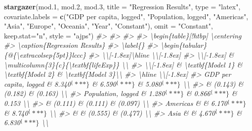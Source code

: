 \documentclass[
]{book}
\newenvironment{Shaded}{\begin{snugshade}}{\end{snugshade}}
\newcommand{\CommentTok}[1]{\textcolor[rgb]{0.56,0.35,0.01}{\textit{#1}}}
\newcommand{\DataTypeTok}[1]{\textcolor[rgb]{0.13,0.29,0.53}{#1}}
\newcommand{\FloatTok}[1]{\textcolor[rgb]{0.00,0.00,0.81}{#1}}
\newcommand{\KeywordTok}[1]{\textcolor[rgb]{0.13,0.29,0.53}{\textbf{#1}}}
\newcommand{\NormalTok}[1]{#1}
\newcommand{\StringTok}[1]{\textcolor[rgb]{0.31,0.60,0.02}{#1}}
\begin{document}
\begin{Shaded}
\begin{Highlighting}[]
\KeywordTok{stargazer}\NormalTok{(mod}\FloatTok{.1}\NormalTok{, mod}\FloatTok{.2}\NormalTok{, mod}\FloatTok{.3}\NormalTok{, }\DataTypeTok{title =} \StringTok{"Regression Results"}\NormalTok{, }\DataTypeTok{type =} \StringTok{"latex"}\NormalTok{, }
          \DataTypeTok{covariate.labels  =} \KeywordTok{c}\NormalTok{(}\StringTok{"GDP per capita, logged"}\NormalTok{, }\StringTok{"Population, logged"}\NormalTok{, }\StringTok{"Americas"}\NormalTok{, }\StringTok{"Asia"}\NormalTok{, }\StringTok{"Europe"}\NormalTok{, }\StringTok{"Oceania"}\NormalTok{, }\StringTok{"Year"}\NormalTok{, }\StringTok{"Constant"}\NormalTok{), }
          \DataTypeTok{omit =} \StringTok{"Constant"}\NormalTok{, }
          \DataTypeTok{keep.stat=}\StringTok{"n"}\NormalTok{, }\DataTypeTok{style =} \StringTok{"ajps"}\NormalTok{)}
\CommentTok{#> }
\CommentTok{#> %
\CommentTok{#> %
\CommentTok{#> \textbackslash{}begin\{table\}[!htbp] \textbackslash{}centering }
\CommentTok{#>   \textbackslash{}caption\{Regression Results\} }
\CommentTok{#>   \textbackslash{}label\{\} }
\CommentTok{#> \textbackslash{}begin\{tabular\}\{@\{\textbackslash{}extracolsep\{5pt\}\}lccc\} }
\CommentTok{#> \textbackslash{}\textbackslash{}[-1.8ex]\textbackslash{}hline \textbackslash{}\textbackslash{}[-1.8ex] }
\CommentTok{#> \textbackslash{}\textbackslash{}[-1.8ex] & \textbackslash{}multicolumn\{3\}\{c\}\{\textbackslash{}textbf\{lifeExp\}\} \textbackslash{}\textbackslash{} }
\CommentTok{#> \textbackslash{}\textbackslash{}[-1.8ex] & \textbackslash{}textbf\{Model 1\} & \textbackslash{}textbf\{Model 2\} & \textbackslash{}textbf\{Model 3\}\textbackslash{}\textbackslash{} }
\CommentTok{#> \textbackslash{}hline \textbackslash{}\textbackslash{}[-1.8ex] }
\CommentTok{#>  GDP per capita, logged & 8.340$^\{***\}$ & 6.590$^\{***\}$ & 5.080$^\{***\}$ \textbackslash{}\textbackslash{} }
\CommentTok{#>   & (0.143) & (0.182) & (0.163) \textbackslash{}\textbackslash{} }
\CommentTok{#>   Population, logged & 1.280$^\{***\}$ & 0.866$^\{***\}$ & 0.153 \textbackslash{}\textbackslash{} }
\CommentTok{#>   & (0.111) & (0.111) & (0.097) \textbackslash{}\textbackslash{} }
\CommentTok{#>   Americas &  & 6.170$^\{***\}$ & 8.740$^\{***\}$ \textbackslash{}\textbackslash{} }
\CommentTok{#>   &  & (0.555) & (0.477) \textbackslash{}\textbackslash{} }
\CommentTok{#>   Asia &  & 4.670$^\{***\}$ & 6.830$^\{***\}$ \textbackslash{}\textbackslash{} }
}}
\end{Highlighting}
\end{Shaded}
\end{document}
